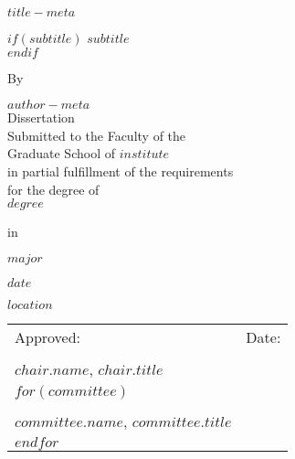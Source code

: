 \thispagestyle{empty}
\begin{center}
\doublespacing
$title-meta$

$if(subtitle)$
$subtitle$\\
$endif$

By

$author-meta$\\[2em]

Dissertation\\
Submitted to the Faculty of the\\
Graduate School of $institute$\\
in partial fulfillment of the requirements\\
for the degree of\\

\uppercase{$degree$}

in

$major$

$date$

$location$\\
\end{center}

\vfill
\begin{center}
\begin{tabular*}{\textwidth}{@{}p{}p{}@{}}
    Approved: & Date: \\[3em]
\hrulefill & \hrulefill\\
$chair.name$, $chair.title$ & \\
$for(committee)$
 &\\[1.5em]
\hrulefill & \hrulefill\\
$committee.name$, $committee.title$\\
$endfor$
\end{tabular*}
\end{center}
